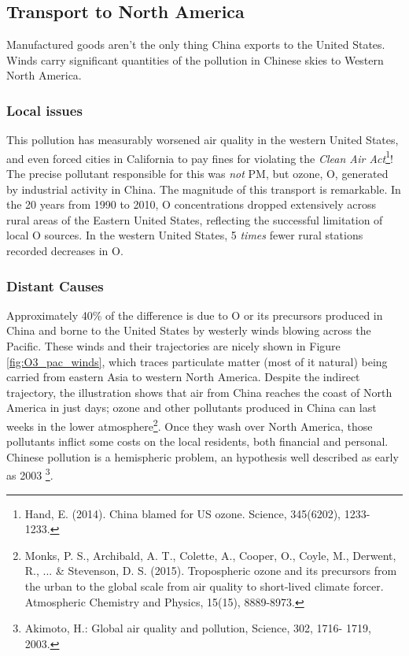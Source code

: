 \subsection{Transport to North America}
Manufactured goods aren't the only thing China exports to the United States. Winds carry significant quantities of the pollution in Chinese skies to Western North America.

\subsubsection{Local issues}
This pollution has measurably worsened air quality in the western United States, and even forced cities in California to pay fines for violating the \emph{Clean Air Act}\footnote{Hand, E. (2014). China blamed for US ozone. Science, 345(6202), 1233-1233.}! The precise pollutant responsible for this was \emph{not} PM, but ozone, O, generated by industrial activity in China. The magnitude of this transport is remarkable. In the 20 years from 1990 to 2010, O concentrations dropped extensively across rural areas of the Eastern United States, reflecting the successful limitation of local O sources. In the western United States, 5 \emph{times} fewer rural stations recorded decreases in O.

\subsubsection{Distant Causes}
Approximately 40\% of the difference is due to O or its precursors produced in China and borne to the United States by westerly winds blowing across the Pacific. These winds and their trajectories are nicely shown in Figure \ref{fig:O3_pac_winds}, which traces particulate matter (most of it natural) being carried from eastern Asia to western North America. Despite the indirect trajectory, the illustration shows that air from China reaches the coast of North America in just days; ozone and other pollutants produced in China can last weeks in the lower atmosphere\footnote{Monks, P. S., Archibald, A. T., Colette, A., Cooper, O., Coyle, M., Derwent, R., ... \& Stevenson, D. S. (2015). Tropospheric ozone and its precursors from the urban to the global scale from air quality to short-lived climate forcer. Atmospheric Chemistry and Physics, 15(15), 8889-8973.}. Once they wash over North America, those pollutants inflict some costs on the local residents, both financial and personal. Chinese pollution is a hemispheric problem, an hypothesis well described as early as 2003 \footnote{Akimoto, H.: Global air quality and pollution, Science, 302, 1716-
1719, 2003.}.  

